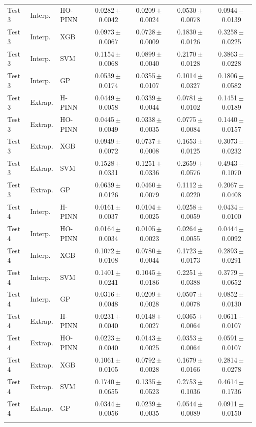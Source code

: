 \begin{longtable}{lllcccc}
Test 3 & Interp. & HO-PINN & 0.0282\,$\pm$\,0.0042 & 0.0209\,$\pm$\,0.0024 & 0.0530\,$\pm$\,0.0078 & 0.0944\,$\pm$\,0.0139 \\
Test 3 & Interp. & XGB & 0.0973\,$\pm$\,0.0067 & 0.0728\,$\pm$\,0.0009 & 0.1830\,$\pm$\,0.0126 & 0.3258\,$\pm$\,0.0225 \\
Test 3 & Interp. & SVM & 0.1154\,$\pm$\,0.0068 & 0.0899\,$\pm$\,0.0040 & 0.2170\,$\pm$\,0.0128 & 0.3863\,$\pm$\,0.0228 \\
Test 3 & Interp. & GP & 0.0539\,$\pm$\,0.0174 & 0.0355\,$\pm$\,0.0107 & 0.1014\,$\pm$\,0.0327 & 0.1806\,$\pm$\,0.0582 \\
\addlinespace[2pt]
Test 3 & Extrap. & H-PINN & 0.0449\,$\pm$\,0.0058 & 0.0339\,$\pm$\,0.0044 & 0.0781\,$\pm$\,0.0102 & 0.1451\,$\pm$\,0.0189 \\
Test 3 & Extrap. & HO-PINN & 0.0445\,$\pm$\,0.0049 & 0.0338\,$\pm$\,0.0035 & 0.0775\,$\pm$\,0.0084 & 0.1440\,$\pm$\,0.0157 \\
Test 3 & Extrap. & XGB & 0.0949\,$\pm$\,0.0072 & 0.0737\,$\pm$\,0.0008 & 0.1653\,$\pm$\,0.0125 & 0.3073\,$\pm$\,0.0232 \\
Test 3 & Extrap. & SVM & 0.1528\,$\pm$\,0.0331 & 0.1251\,$\pm$\,0.0336 & 0.2659\,$\pm$\,0.0576 & 0.4943\,$\pm$\,0.1070 \\
Test 3 & Extrap. & GP & 0.0639\,$\pm$\,0.0126 & 0.0460\,$\pm$\,0.0079 & 0.1112\,$\pm$\,0.0220 & 0.2067\,$\pm$\,0.0408 \\
\addlinespace[2pt]
Test 4 & Interp. & H-PINN & 0.0161\,$\pm$\,0.0037 & 0.0104\,$\pm$\,0.0025 & 0.0258\,$\pm$\,0.0059 & 0.0434\,$\pm$\,0.0100 \\
Test 4 & Interp. & HO-PINN & 0.0164\,$\pm$\,0.0034 & 0.0105\,$\pm$\,0.0023 & 0.0264\,$\pm$\,0.0055 & 0.0444\,$\pm$\,0.0092 \\
Test 4 & Interp. & XGB & 0.1072\,$\pm$\,0.0108 & 0.0780\,$\pm$\,0.0044 & 0.1723\,$\pm$\,0.0173 & 0.2893\,$\pm$\,0.0291 \\
Test 4 & Interp. & SVM & 0.1401\,$\pm$\,0.0241 & 0.1045\,$\pm$\,0.0186 & 0.2251\,$\pm$\,0.0388 & 0.3779\,$\pm$\,0.0652 \\
Test 4 & Interp. & GP & 0.0316\,$\pm$\,0.0048 & 0.0209\,$\pm$\,0.0028 & 0.0507\,$\pm$\,0.0078 & 0.0852\,$\pm$\,0.0130 \\
\addlinespace[2pt]
Test 4 & Extrap. & H-PINN & 0.0231\,$\pm$\,0.0040 & 0.0148\,$\pm$\,0.0027 & 0.0365\,$\pm$\,0.0064 & 0.0611\,$\pm$\,0.0107 \\
Test 4 & Extrap. & HO-PINN & 0.0223\,$\pm$\,0.0040 & 0.0143\,$\pm$\,0.0025 & 0.0353\,$\pm$\,0.0064 & 0.0591\,$\pm$\,0.0107 \\
Test 4 & Extrap. & XGB & 0.1061\,$\pm$\,0.0105 & 0.0792\,$\pm$\,0.0028 & 0.1679\,$\pm$\,0.0166 & 0.2814\,$\pm$\,0.0278 \\
Test 4 & Extrap. & SVM & 0.1740\,$\pm$\,0.0655 & 0.1335\,$\pm$\,0.0523 & 0.2753\,$\pm$\,0.1036 & 0.4614\,$\pm$\,0.1736 \\
Test 4 & Extrap. & GP & 0.0344\,$\pm$\,0.0056 & 0.0239\,$\pm$\,0.0035 & 0.0544\,$\pm$\,0.0089 & 0.0911\,$\pm$\,0.0150 \\
\addlinespace[2pt]
\end{longtable}
\endgroup
